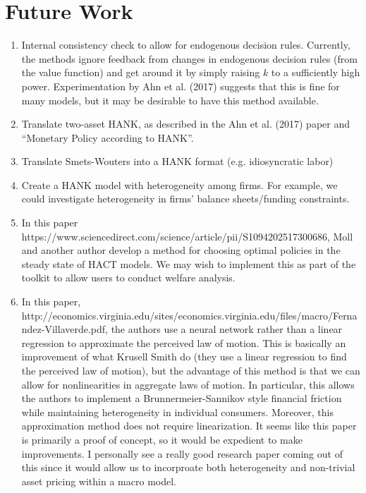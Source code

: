 \documentclass[12 pt, oneside]{article}
\theoremstyle{definition}
\theoremstyle{definition}
\theoremstyle{definition}
\begin{document}
\section{Future Work}
\begin{enumerate}
\item Internal consistency check to allow for endogenous decision rules. Currently, the methods ignore feedback from changes in endogenous decision rules (from the value function) and get around it by simply raising $k$ to a sufficiently high power. Experimentation by Ahn et al. (2017) suggests that this is fine for many models, but it may be desirable to have this method available.
\item Translate two-asset HANK, as described in the Ahn et al. (2017) paper and ``Monetary Policy according to HANK''.
\item Translate Smets-Wouters into a HANK format (e.g. idiosyncratic labor)
\item Create a HANK model with heterogeneity among firms. For example, we could investigate heterogeneity in firms' balance sheets/funding constraints.
\item In this paper https://www.sciencedirect.com/science/article/pii/S1094202517300686, Moll and another author develop a method for choosing optimal policies in the steady state of HACT models. We may wish to implement this as part of the toolkit to allow users to conduct welfare analysis.
\item In this paper, http://economics.virginia.edu/sites/economics.virginia.edu/files/macro/Fernandez-Villaverde.pdf, the authors use a neural network rather than a linear regression to approximate the perceived law of motion. This is basically an improvement of what Krusell Smith do (they use a linear regression to find the perceived law of motion), but the advantage of this method is that we can allow for nonlinearities in aggregate laws of motion. In particular, this allows the authors to implement a Brunnermeier-Sannikov style financial friction while maintaining heterogeneity in individual consumers. Moreover, this approximation method does not require linearization. It seems like this paper is primarily a proof of concept, so it would be expedient to make improvements. I personally see a really good research paper coming out of this since it would allow us to incorproate both heterogeneity and non-trivial asset pricing within a macro model.
\end{enumerate}
\end{document}
